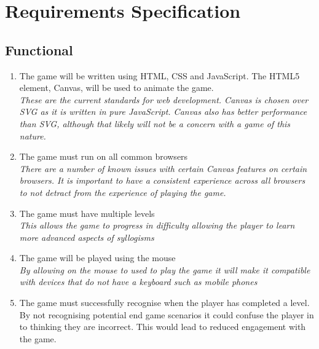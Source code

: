 \documentclass[12pt,a4paper]{report}
\begin{document}
{\let\clearpage\relax \chapter{Requirements Specification}}
   \section{Functional}
   \begin{enumerate}[label*=\thesection .\arabic*]
            \item The game will be written using HTML, CSS and JavaScript. The HTML5 element, Canvas, will be used to animate the game.\\
            \textit{These are the current standards for web development. Canvas is chosen over SVG as it is written in pure JavaScript. Canvas also has better performance than SVG, although that likely will not be a concern with a game of this nature. }
            \item The game must run on all common browsers\\
            \textit{There are a number of known issues with certain Canvas features on certain browsers. It is important to have a consistent experience across all browsers to not detract from the experience of playing the game. }
            \item The game must have multiple levels\\
            \textit{This allows the game to progress in difficulty allowing the player to learn more advanced aspects of syllogisms}
            \item The game will be played using the mouse\\
            \textit{By allowing on the mouse to used to play the game it will make it compatible with devices that do not have a keyboard such as mobile phones}
            \item The game must successfully recognise when the player has completed a level.\\
            {By not recognising potential end game scenarios it could confuse the player in to thinking they are incorrect. This would lead to reduced engagement with the game.}
        \end{enumerate}
\end{document}

